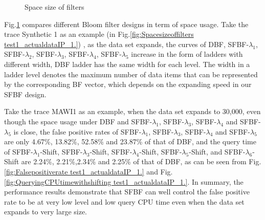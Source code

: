 \documentclass[10pt,journal,letterpaper]{IEEEtran}
\newcommand{\rev}[1]{\uwave{#1}}
\begin{document}
\begin{figure}[!htb]
{\label{fig:Spacesizeoffilters test1 actualdata webcache 1.}}
\caption{Space size of filters}
\label{fig:Space size of filters.}
\end{figure}



Fig.\ref{fig:Space size of filters.} compares different Bloom filter designs in term of space usage.
Take the trace Synthetic 1 as an example (in Fig.\ref{fig:Spacesizeoffilters test1_actualdataIP_1.}) , as the data set expands, the curves of DBF, SFBF-$\lambda_1$, SFBF-$\lambda_2$, SFBF-$\lambda_3$, SFBF-$\lambda_4$, SFBF-$\lambda_5$ increase in the form of ladders with different width, \rev{while the} DBF ladder has the same width for each level.
The width in a ladder level denotes the maximum number of data items that can be represented by the corresponding BF vector, which depends on the expanding speed in our SFBF design.

Take the trace MAWI1 as an example, when the data set expands to 30,000, even though the space usage under DBF and SFBF-$\lambda_1$,  SFBF-$\lambda_3$, SFBF-$\lambda_4$ and SFBF-$\lambda_5$ is close, the false positive rates of SFBF-$\lambda_1$,  SFBF-$\lambda_3$, SFBF-$\lambda_4$ and SFBF-$\lambda_5$ are only 4.67\%,  13.82\%, 52.58\% and 23.87\% of that of DBF, and the query time of SFBF-$\lambda_1$-Shift,  SFBF-$\lambda_3$-Shift, SFBF-$\lambda_4$-Shift, SFBF-$\lambda_5$-Shift, and SFBF-$\lambda_6$-Shift are 2.24\%, 2.21\%,2.34\% and 2.25\% of that of DBF, as can be seen from Fig.\ref{fig:Falsepositiverate test1_actualdataIP_1.} and Fig.\ref{fig:QueryingCPUtimewithshifting test1_actualdataIP_1.}.
In summary, the performance results demonstrate that SFBF can well control the false positive rate to be at very low level and low query CPU time even when the data set expands to very large size.
\end{document}
